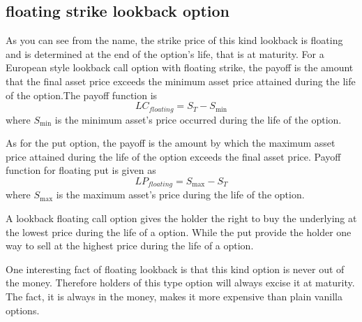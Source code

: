 \documentclass[11pt]{book}
\begin{document}
\subsection{floating strike lookback option}
As you can see from the name, the strike price of this kind lookback is floating and is determined at the end of the option's life, that is at maturity. For a European style lookback call option with floating strike, the payoff is the amount that the final asset price exceeds the minimum asset price attained during the life of the option.The payoff function is 
\begin{equation}
LC_{floating} = S_T - S_{\min}
\end{equation}
where $S_{\min}$ is the minimum asset's price occurred during the life of the option.

As for the put option, the payoff is the amount by which the maximum asset price attained during the life of the option exceeds the final asset price. Payoff function for floating put is given as
\begin{equation}
LP_{floating}=S_{\max}-S_T
\end{equation}
where $S_{\max}$ is the maximum asset's price during the life of the option. 

A lookback floating call option gives the holder the right to buy the underlying at the lowest price during the life of a option. While the put provide the holder one way to sell at the highest price during the life of a option. 

One interesting fact of floating lookback is that this kind option is never out of the money. Therefore holders of this type option will always excise it at maturity. The fact, it is always in the money, makes it more expensive than plain vanilla options. 
\end{document}
